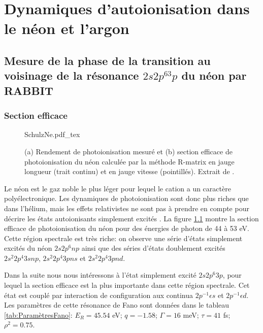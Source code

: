 \part{Dynamiques d'autoionisation dans le néon et l'argon}
\label{part:Argon}


\chapter[Mesure de la phase de la transition au voisinage de la résonance $2s2p^63p$ du néon par RABBIT]{Mesure de la phase de la transition au voisinage de la résonance \MakeLowercase{$2s2p^63p$} du néon par RABBIT}
\label{chap:Neon}

\section{Section efficace}
\begin{figure}[ht]
\centering
\def\svgwidth{0.6\textwidth}
{SchulzNe.pdf_tex}
\caption{(a) Rendement de photoionisation mesuré et (b) section efficace de photoionisation du néon calculée par la méthode R-matrix en jauge longueur (trait continu) et en jauge vitesse (pointillés). Extrait de .}
\label{fig:SchulzNe}
\end{figure}

Le néon est le gaz noble le plus léger pour lequel le cation a un caractère polyélectronique. Les dynamiques de photoionisation sont donc plus riches que dans l'hélium, mais les effets relativistes ne sont pas à prendre en compte pour décrire les états autoionisants simplement excités . La figure \ref{fig:SchulzNe} montre la section efficace de photoionisation du néon pour des énergies de photon de 44 à 53 eV. Cette région spectrale est très riche: on observe une série d'états simplement excités du néon $2s2p^{6}np$ ainsi que des séries d'états doublement excités $2s^{2}2p^{4}3snp$, $2s^{2}2p^{4}3pns$ et $2s^{2}2p^{4}3pnd$. 

Dans la suite nous nous intéressons à l'état simplement excité $2s2p^{6}3p$, pour lequel la section efficace est la plus importante dans cette région spectrale. Cet état est couplé par interaction de configuration aux continua $2p^{-1}\epsilon s$ et $2p^{-1}\epsilon d$. Les paramètres de cette résonance de Fano sont données dans le tableau \ref{tab:ParamètresFano}: $E_R = 45.54$ eV; $q = -1.58$; $\Gamma =  16$ meV; $\tau = 41$ fs; $\rho^2 = 0.75$.

